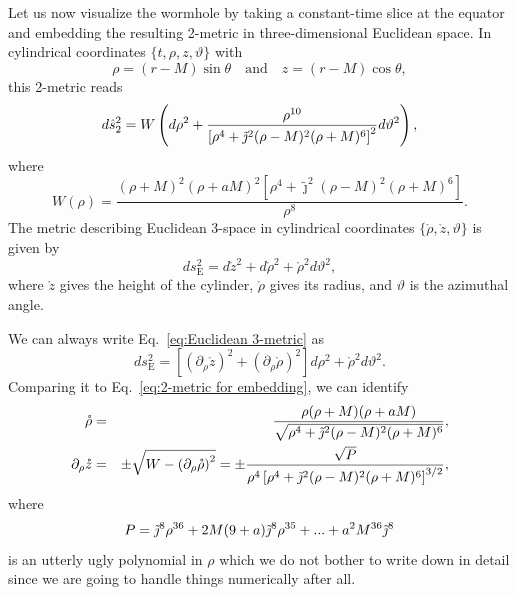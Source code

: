 \documentclass[aps,preprint,groupedaddress,nofootinbib,superscriptaddress,showkeys,showpacs,eqsecnum,amsmath,amssymb]{revtex4-1}
\begin{document}
Let us now visualize the wormhole by taking a constant-time slice at the equator and embedding the resulting 2-metric in three-dimensional Euclidean space. In cylindrical coordinates $\{t,\rho,z,\vartheta\}$ with
\begin{equation}
    \rho=(r-M)\sin\theta\quad \text{and}\quad z=(r-M)\cos\theta,\label{eq:CYcoords}
\end{equation}
this 2-metric reads 
\begin{equation}
    d\hat{s}^2_2 = W\left( d\rho^2 + \frac{\rho^{10}}{\left[ \rho^4 + \Tilde{\jmath}^2(\rho-M)^2(\rho+M)^6 \right]^2}d\vartheta^2\right),\label{eq:2-metric for embedding}
\end{equation}
where 
\begin{equation}
    {W}(\rho) = \frac{(\rho+M)^2(\rho+a M)^2\left[ \rho^4 + \tilde{\jmath}^2(\rho-M)^2(\rho+M)^6 \right]}{\rho^8}.
\end{equation}
The metric describing Euclidean 3-space in cylindrical coordinates $\{\mathring{\rho},\mathring{z},\vartheta\}$ is given by
\begin{equation}
    ds^2_{\text{E}} = d \mathring{z}^2 + d\mathring{\rho}^2 + \mathring{\rho}^2d\vartheta^2,\label{eq:Euclidean 3-metric}
\end{equation}
where $\mathring{z}$ gives the height of the cylinder, $\mathring{\rho}$ gives its radius, and $\vartheta$ is the azimuthal angle. 

We can always write Eq.~\eqref{eq:Euclidean 3-metric} as 
\begin{equation}
    ds^2_{\text{E}} = \left[ \left( \partial_\rho \mathring{z} \right)^2 + \left( \partial_\rho \mathring{\rho} \right)^2 \right] d\rho^2 + \mathring{\rho}^2 d\vartheta^2.
\end{equation}
Comparing it to Eq.~\eqref{eq:2-metric for embedding}, we can identify 
\begin{eqnarray}
\mathring{\rho}&=&\frac{\rho(\rho+M)(\rho+a M)}{\sqrt{\rho^4 + \Tilde{\jmath}^2(\rho-M)^2(\rho+M)^6}},\\
\partial_\rho \mathring{z}&=&\pm \sqrt{W-\left( \partial_\rho \mathring{\rho} \right)^2}=\pm\frac{\sqrt{{P}}}{\rho^4\left[ \rho^4 + \tilde{\jmath}^2(\rho-M)^2(\rho+M)^6 \right]^{3/2}},\label{eq:ODE}
\end{eqnarray}
where 
\begin{equation}
    {P} = \Tilde{\jmath}^8\rho^{36}+2M(9+a)\Tilde{\jmath}^8\rho^{35}+...+a^2M^{36}\Tilde{\jmath}^8
\end{equation}
is an utterly ugly polynomial in $\rho$ which we do not bother to write down in detail since we are going to handle things numerically after all. 
\end{document}
